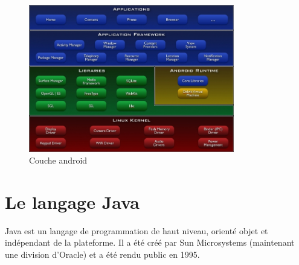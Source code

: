 	\begin{figure}[!h]
    	\center
    		\includegraphics[width=0.8\textwidth]{image/318598}
   		\caption{Couche android}
    	\label{Couche android}
	\end{figure}
\section{Le langage Java}
Java est un langage de programmation de haut niveau, orienté objet et indépendant de la plateforme. Il a été créé par Sun Microsystems (maintenant une division d'Oracle) et a été rendu public en 1995.
